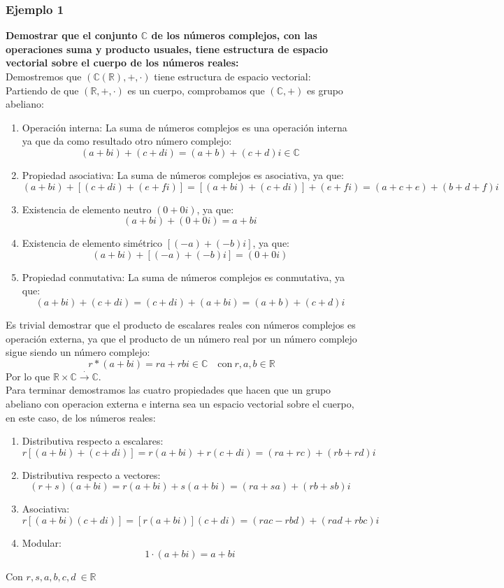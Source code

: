 \subsubsection*{Ejemplo 1}
\textbf{Demostrar que el conjunto $\mathbb{C}$ de los números complejos, con las operaciones suma y producto usuales, tiene estructura de espacio vectorial sobre el cuerpo de los números reales:}\\
Demostremos que $(\mathbb{C}(\mathbb{R}),+,\cdot)$ tiene estructura de espacio vectorial:\\
Partiendo de que $(\mathbb{R},+,\cdot)$ es un cuerpo, comprobamos que $(\mathbb{C},+)$ es grupo abeliano:
\begin{enumerate}
\item Operación interna: La suma de números complejos es una operación interna ya que da como resultado otro número complejo:
$$
(a+bi)+(c+di)=(a+b)+(c+d)i \in \mathbb{C}
$$
\item Propiedad asociativa: La suma de números complejos es asociativa, ya que:
$$
(a+bi)+[(c+di)+(e+fi)]=[(a+bi)+(c+di)]+(e+fi)=(a+c+e)+(b+d+f)i
$$
\item Existencia de elemento neutro $(0+0i)$, ya que:
$$
(a+bi)+(0+0i)=a+bi
$$
\item Existencia de elemento simétrico $[(-a)+(-b)i]$, ya que:
$$
(a+bi)+[(-a)+(-b)i]=(0+0i)
$$
\item Propiedad conmutativa: La suma de números complejos es conmutativa, ya que:
$$
(a+bi)+(c+di)=(c+di)+(a+bi)=(a+b)+(c+d)i
$$
\end{enumerate}
Es trivial demostrar que el producto de escalares reales con números complejos es operación externa, ya que el producto de un número real por un número complejo sigue siendo un número complejo:
$$
r*(a+bi)=ra+rbi \in \mathbb{C}\quad \text{con} \ r,a,b\in \mathbb{R}
$$
Por lo que $\mathbb{R}\times \mathbb{C} \overset{\cdot}{\rightarrow} \mathbb{C}$.\\

Para terminar demostramos las cuatro propiedades que hacen que un grupo abeliano con operacion externa e interna sea un espacio vectorial sobre el cuerpo, en este caso, de los números reales:
\begin{enumerate}
\item Distributiva respecto a escalares:
$$
r[(a+bi)+(c+di)]=r(a+bi)+r(c+di)=(ra+rc)+(rb+rd)i
$$
\item Distributiva respecto a vectores:
$$
(r+s)(a+bi)=r(a+bi)+s(a+bi)=(ra+sa)+(rb+sb)i
$$
\item Asociativa:
$$
r[(a+bi)(c+di)]=[r(a+bi)](c+di)=(rac-rbd)+(rad+rbc)i
$$
\item Modular:
$$
1\cdot(a+bi)=a+bi
$$
\end{enumerate}
Con $r,s,a,b,c,d\ \in \mathbb{R}$\\

